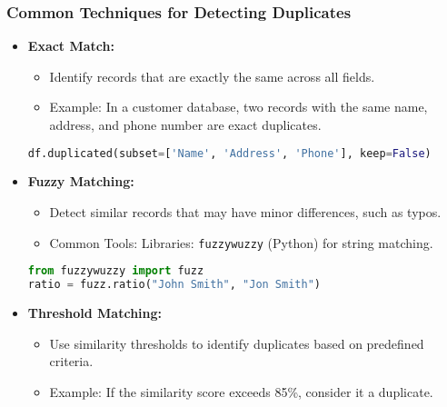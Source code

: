 \documentclass[aspectratio=169]{beamer}
\begin{document}
\begin{frame}[fragile]
  \frametitle{Common Techniques for Detecting Duplicates}
  
  \begin{itemize}
    \item \textbf{Exact Match:}
      \begin{itemize}
        \item Identify records that are exactly the same across all fields.
        \item Example: In a customer database, two records with the same name, address, and phone number are exact duplicates.
      \end{itemize}
      \begin{lstlisting}[language=Python]
df.duplicated(subset=['Name', 'Address', 'Phone'], keep=False)
      \end{lstlisting}
    
    \item \textbf{Fuzzy Matching:}
      \begin{itemize}
        \item Detect similar records that may have minor differences, such as typos.
        \item Common Tools: Libraries: \texttt{fuzzywuzzy} (Python) for string matching.
      \end{itemize}
      \begin{lstlisting}[language=Python]
from fuzzywuzzy import fuzz
ratio = fuzz.ratio("John Smith", "Jon Smith")
      \end{lstlisting}

    \item \textbf{Threshold Matching:}
      \begin{itemize}
        \item Use similarity thresholds to identify duplicates based on predefined criteria.
        \item Example: If the similarity score exceeds 85\%, consider it a duplicate.
      \end{itemize}
  \end{itemize}
\end{frame}
\end{document}

